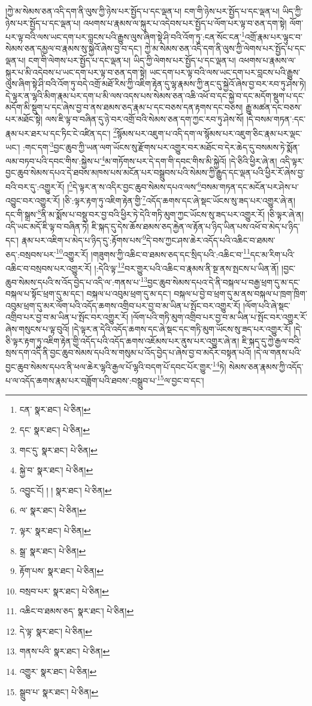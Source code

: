 །ཀྱེ་མ་སེམས་ཅན་འདི་དག་ནི་ལུས་ཀྱི་ཉེས་པར་སྤྱོད་པ་དང་ལྡན་པ། ངག་གི་ཉེས་པར་སྤྱོད་པ་དང་ལྡན་པ། ཡིད་ཀྱི་ཉེས་པར་སྤྱོད་པ་དང་ལྡན་པ། འཕགས་པ་རྣམས་ལ་སྐུར་པ་འདེབས་པར་སྤྱོད་པ་ལོག་པར་ལྟ་བ་ཅན་དག་སྟེ། ལོག་པར་ལྟ་བའི་ལས་ཡང་དག་པར་བླངས་པའི་རྒྱུས་ལུས་ཞིག་སྟེ་ཤི་བའི་འོག་ཏུ་:ངན་སོང་ངན་\footnote{ངན་  སྣར་ཐང་།  པེ་ཅིན། }འགྲོ་རྣམ་པར་ལྟུང་བ་སེམས་ཅན་དམྱལ་བ་རྣམས་སུ་སྐྱེའོ་ཞེས་བྱ་བ་དང་། ཀྱེ་མ་སེམས་ཅན་འདི་དག་ནི་ལུས་ཀྱི་ལེགས་པར་སྤྱོད་པ་དང་ལྡན་པ། ངག་གི་ལེགས་པར་སྤྱོད་པ་དང་ལྡན་པ། ཡིད་ཀྱི་ལེགས་པར་སྤྱོད་པ་དང་ལྡན་པ། འཕགས་པ་རྣམས་ལ་སྐུར་པ་མི་འདེབས་པ་ཡང་དག་པར་ལྟ་བ་ཅན་དག་སྟེ། ཡང་དག་པར་ལྟ་བའི་ལས་ཡང་དག་པར་བླངས་པའི་རྒྱུས་ལུས་ཞིག་སྟེ་ཤི་བའི་འོག་ཏུ་བདེ་འགྲོ་མཐོ་རིས་ཀྱི་འཇིག་རྟེན་དུ་ལྷ་རྣམས་ཀྱི་ནང་དུ་སྐྱེའོ་ཞེས་བྱ་བར་རབ་ཏུ་ཤེས་ཏེ། དེ་ལྟར་ན་ལྷའི་མིག་རྣམ་པར་དག་པ་མི་ལས་འདས་པས་སེམས་ཅན་འཆི་འཕོ་བ་དང་སྐྱེ་བ་དང་མདོག་སྡུག་པ་དང་མདོག་མི་སྡུག་པ་དང་ཞེས་བྱ་བ་ནས་ཐམས་ཅད་རྣམ་པ་དང་བཅས་དན་རྟགས་དང་བཅས། རྒྱུ་མཚན་དང་བཅས་པར་མཐོང་སྟེ། ལས་ཇི་ལྟ་བ་བཞིན་དུ་ཉེ་བར་འགྲོ་བའི་སེམས་ཅན་དག་ཀྱང་རབ་ཏུ་ཤེས་སོ། །དེ་བསམ་གཏན་:དང་རྣམ་པར་ཐར་པ་དང་ཏིང་ངེ་འཛིན་དང་། \footnote{དང་  སྣར་ཐང་།  པེ་ཅིན། }སྙོམས་པར་འཇུག་པ་འདི་དག་ལ་སྙོམས་པར་འཇུག་ཅིང་རྣམ་པར་ལྡང་ཡང་། :གང་དག་\footnote{གང་དུ་  སྣར་ཐང་།  པེ་ཅིན། }བྱང་ཆུབ་ཀྱི་ཡན་ལག་ཡོངས་སུ་རྫོགས་པར་འགྱུར་བར་མཐོང་བ་དེར་ཆེད་དུ་བསམས་ཏེ་སྨོན་ལམ་བཏབ་པའི་དབང་གིས་:སྐྱེས་པ་\footnote{སྐྱེ་བ་  སྣར་ཐང་།  པེ་ཅིན། }མ་གཏོགས་པར་དེ་དག་གི་དབང་གིས་མི་སྐྱེའོ། །དེ་ཅིའི་ཕྱིར་ཞེ་ན། འདི་ལྟར་བྱང་ཆུབ་སེམས་དཔའ་དེ་ཐབས་མཁས་པས་མངོན་པར་བསྒྲུབས་པའི་སེམས་ཀྱི་རྒྱུད་དང་ལྡན་པའི་ཕྱིར་རོ་ཞེས་བྱ་བའི་བར་དུ་:འགྱུར་རོ། །\footnote{འབྱུང་ངོ། ། །  སྣར་ཐང་།  པེ་ཅིན། }དེ་ལྟར་ན་ས་འདིར་བྱང་ཆུབ་སེམས་དཔའ་ལས་\footnote{ལ་  སྣར་ཐང་།  པེ་ཅིན། }བསམ་གཏན་དང་མངོན་པར་ཤེས་པ་འབྱུང་བར་འགྱུར་རོ། །ཅི་:ལྟར་རྟག་ཏུ་འཇིག་རྟེན་གྱི་\footnote{ལྟར་  སྣར་ཐང་།  པེ་ཅིན། }འདོད་ཆགས་དང་ཞེ་སྡང་ཡོངས་སུ་ཟད་པར་འགྱུར་ཞེ་ན། དང་གི་སྒྲས་\footnote{སྒྲ་  སྣར་ཐང་།  པེ་ཅིན། }ནི་མ་སྨོས་པ་བསྡུ་བར་བྱ་བའི་ཕྱིར་ཏེ་དེའི་གཏི་མུག་ཀྱང་ཡོངས་སུ་ཟད་པར་འགྱུར་རོ། །ཅི་ལྟར་ཞེ་ན། འདི་ཡང་མདོ་ཇི་ལྟ་བ་བཞིན་ཏེ། ཇི་སྐད་དུ་དེས་ཆོས་ཐམས་ཅད་རྐྱེན་ལ་རྟོན་པ་ཉིད་ཡིན་པས་འཕོ་བ་མེད་པ་ཉིད་དང་། རྣམ་པར་འཇིག་པ་མེད་པ་ཉིད་དུ་:རྟོགས་པས་\footnote{རྟོག་པས་  སྣར་ཐང་།  པེ་ཅིན། }དེ་བས་ཀྱང་ཤས་ཆེར་འདོད་པའི་འཆིང་བ་ཐམས་ཅད་:བསྲབས་པར་\footnote{བསྲབ་པར་  སྣར་ཐང་།  པེ་ཅིན། }འགྱུར་རོ། །གཟུགས་ཀྱི་འཆིང་བ་ཐམས་ཅད་དང་སྲིད་པའི་:འཆིང་བ་\footnote{འཆིང་བ་ཐམས་ཅད་  སྣར་ཐང་།  པེ་ཅིན། }དང་མ་རིག་པའི་འཆིང་བ་བསྲབས་པར་འགྱུར་རོ། །:དེའི་ལྟ་\footnote{དེ་ལྟ་  སྣར་ཐང་།  པེ་ཅིན། }བར་གྱུར་པའི་འཆིང་བ་རྣམས་ནི་སྔ་ནས་སྤངས་པ་ཡིན་ནོ། །བྱང་ཆུབ་སེམས་དཔའི་ས་འོད་བྱེད་པ་འདི་ལ་:གནས་པ་\footnote{གནས་པའི་  སྣར་ཐང་།  པེ་ཅིན། }བྱང་ཆུབ་སེམས་དཔའ་དེ་ནི་བསྐལ་པ་བརྒྱ་ཕྲག་དུ་མ་དང་བསྐལ་པ་སྟོང་ཕྲག་དུ་མ་དང་། བསྐལ་པ་འབུམ་ཕྲག་དུ་མ་དང་། བསྐལ་པ་བྱེ་བ་ཕྲག་དུ་མ་ནས་བསྐལ་པ་ཁྲག་ཁྲིག་འབུམ་ཕྲག་དུ་མར་ལོག་པའི་འདོད་ཆགས་འགྲིབ་པར་བྱ་བ་མ་ཡིན་པ་སྤོང་བར་འགྱུར་རོ། །ལོག་པའི་ཞེ་སྡང་འགྲིབ་པར་བྱ་བ་མ་ཡིན་པ་སྤོང་བར་འགྱུར་རོ། །ལོག་པའི་གཏི་མུག་འགྲིབ་པར་བྱ་བ་མ་ཡིན་པ་སྤོང་བར་འགྱུར་རོ་ཞེས་གསུངས་པ་ལྟ་བུའོ། །དེ་ལྟར་ན་དེའི་འདོད་ཆགས་དང་ཞེ་སྡང་དང་གཏི་མུག་ཡོངས་སུ་ཟད་པར་འགྱུར་རོ། །དེ་ཅི་ལྟར་རྟག་ཏུ་འཇིག་རྟེན་གྱི་འདོད་པའི་འདོད་ཆགས་འཇོམས་པར་ནུས་པར་འགྱུར་ཞེ་ན། ཇི་སྐད་དུ་ཀྱེ་རྒྱལ་བའི་སྲས་དག་འདི་ནི་བྱང་ཆུབ་སེམས་དཔའི་ས་གསུམ་པ་འོད་བྱེད་པ་ཞེས་བྱ་བ་མདོར་བསྟན་པའོ། །དེ་ལ་གནས་པའི་བྱང་ཆུབ་སེམས་དཔའ་ནི་ཕལ་ཆེར་ལྷའི་རྒྱལ་པོ་ལྷའི་བདག་པོ་དབང་པོར་གྱུར་\footnote{འགྱུར་  སྣར་ཐང་།  པེ་ཅིན། }ཏེ། སེམས་ཅན་རྣམས་ཀྱི་འདོད་པ་ལ་འདོད་ཆགས་རྣམ་པར་བཟློག་པའི་ཐབས་:བསྒྲུབ་པ་\footnote{སྒྲུབ་པ་  སྣར་ཐང་།  པེ་ཅིན། }ལ་བྱང་བ་དང་། 